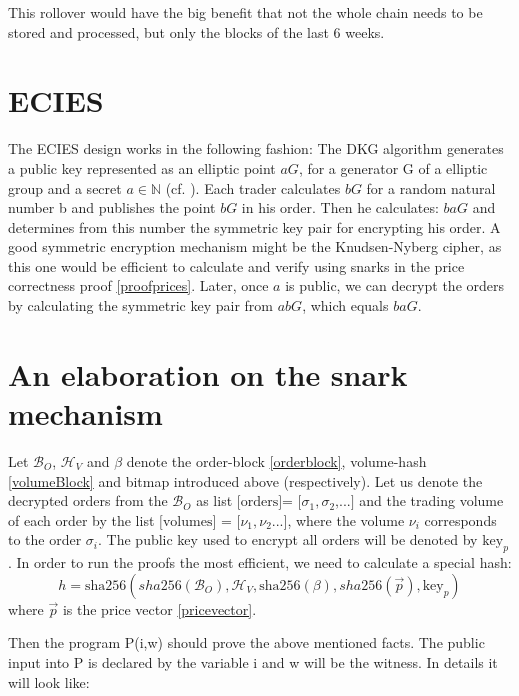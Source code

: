 \documentclass[11pt,parskip=full]{scrartcl}%
\begin{document}
This rollover would have the big benefit that not the whole chain needs to be stored and processed, but only the blocks of the last 6 weeks. 
\begin{appendices}
\section{ECIES}
\label{ECIES}
The ECIES design works in the following fashion:
The DKG algorithm generates a public key represented as an elliptic point $aG\label{public key}$, for a generator G of a elliptic group and a secret $a\in \mathbb{N}$ (cf. \cite{DKG}).  Each trader calculates $bG \label{salt}$ for a random natural number b and publishes the point $bG$  in his order. 
Then he calculates: $baG$ and determines from this number the symmetric key pair for encrypting his order. 
A good symmetric encryption mechanism might be the Knudsen-Nyberg cipher\cite{cipher}, as this one would be efficient to calculate and verify using snarks in the price correctness proof \ref{proofprices}.
Later, once $a$ is public, we can decrypt the orders by calculating the symmetric key pair from $abG$, which equals $baG$.

\section{An elaboration on the snark mechanism}
\label{snarkElaboration}
Let $\mathcal{B}_O$, $\mathcal{H}_V$ and $\beta$ denote the order-block \ref{orderblock}, volume-hash \ref{volumeBlock} and bitmap introduced above (respectively). 
Let us denote the decrypted orders from the $\mathcal{B}_O$ as list $\text{[orders]= [}\sigma_1, \sigma_2\text{,...]}$ and the trading volume of each order by the list $\text{[volumes] = [}\nu_1, \nu_2\text{...]}$, where the volume $\nu_i$ corresponds to the order $\sigma_i$. 
The public key used to encrypt all orders will be denoted by $\text{key}_p$.
In order to run the proofs the most efficient, we need to calculate a special hash:
\begin{equation}
h = \text{sha256}(sha256(\mathcal{B}_O),\mathcal{H}_V, \text{sha256}(\beta), sha256(\vec{p}), \text{key}_p) 
\end{equation}
where $\vec{p}$ is the price vector \ref{pricevector}.

Then the program P(i,w) should prove the above mentioned facts. 
The public input into P is declared by the variable i and w will be the witness. 
In details it will look like:


\end{appendices}
\end{document}
